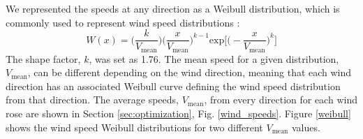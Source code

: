 We represented the speeds at any direction as a Weibull distribution, which is commonly used to represent wind speed distributions \citep{justus1978methods,rehman1994weibull,dorvlo2002estimating}: 
\begin{equation}
W(x) = \Big(\frac{k}{V_{\text{mean}}}\Big)\Big(\frac{x}{V_{\text{mean}}}\Big)^{k-1}\text{exp}\Big[\Big(-\frac{x}{V_{\text{mean}}}\Big)^k\Big]
\end{equation}
The shape factor, $k$, was set as 1.76. 
The mean speed for a given distribution, $V_{\text{mean}}$, can be different depending on the wind direction, meaning that each wind direction has an associated Weibull curve defining the wind speed distribution from that direction. The average speeds, $V_{\text{mean}}$, from every direction for each wind rose are shown in Section \ref{sec:optimization}, Fig. \ref{wind_speeds}.
Figure \ref{weibull} shows the wind speed Weibull distributions for two different $V_{\text{mean}}$ values. 


